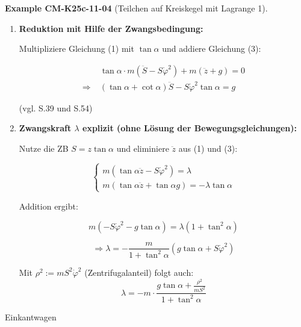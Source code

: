 \documentclass[10pt, letterpaper]{article}
\newcommand{\CustomHeading}[3]{%
  \par\medskip\noindent%
  \textbf{#1 #2} \textnormal{(#3)}.\enskip%
}
\newenvironment{EXA}[2]{\begin{unitbox}\CustomHeading{Example}{#1}{#2}}{\end{unitbox}}
\begin{document}
\begin{EXA}{CM-K25c-11-04}{Teilchen auf Kreiskegel mit Lagrange 1}
\begin{enumerate}[label=\textbf{\arabic*)}, itemsep=1.5em]
\begin{align*}
Z_S &= \vec{Z} \cdot \frac{\partial \vec{r}}{\partial S} = \lambda \\[0.5em]
Z_z &= \vec{Z} \cdot \frac{\partial \vec{r}}{\partial z} = -\lambda \tan\alpha \quad \text{(vgl. S.38)}
\end{align*}

\item \textbf{Reduktion mit Hilfe der Zwangsbedingung:}

Multipliziere Gleichung (1) mit \( \tan\alpha \) und addiere Gleichung (3):

\begin{align*}
&\tan\alpha \cdot m(\ddot{S} - S \dot{\varphi}^2) + m(\ddot{z} + g) = 0 \\
\Rightarrow \; & (\tan\alpha + \cot\alpha) \ddot{S} - S \dot{\varphi}^2 \tan\alpha = g
\end{align*}

(vgl. S.39 und S.54)

\item \textbf{Zwangskraft \(\lambda\) explizit (ohne Lösung der Bewegungsgleichungen):}

Nutze die ZB \( S = z \tan\alpha \) und eliminiere \( \ddot{z} \) aus (1) und (3):

\[
\begin{cases}
m(\tan\alpha \ddot{z} - S \dot{\varphi}^2) = \lambda \\
m(\tan\alpha \ddot{z} + \tan\alpha g) = -\lambda \tan\alpha
\end{cases}
\]

Addition ergibt:

\[
m(-S \dot{\varphi}^2 - g \tan\alpha) = \lambda (1 + \tan^2\alpha)
\]

\[
\Rightarrow \lambda = -\frac{m}{1 + \tan^2\alpha} \left( g \tan\alpha + S \dot{\varphi}^2 \right)
\]

Mit \( \rho^2 := m S^2 \dot{\varphi}^2 \) (Zentrifugalanteil) folgt auch:
\[
\lambda = -m \cdot \frac{g \tan\alpha + \frac{\rho^2}{m S^2}}{1 + \tan^2\alpha}
\]

\end{enumerate}
\end{EXA}






Einkantwagen
\end{document}
